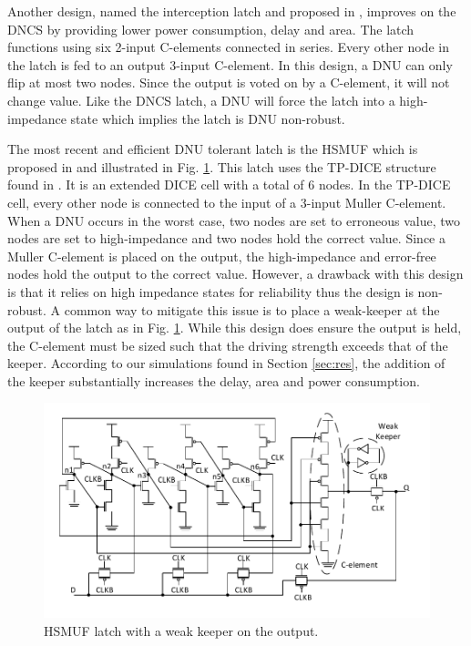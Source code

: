 Another design, named the interception latch and proposed in \cite{Inter}, improves on the DNCS by providing lower power consumption, delay and area. The latch functions using six 2-input C-elements connected in series. Every other node in the latch is fed to an output 3-input C-element. In this design, a DNU can only flip at most two nodes. Since the output is voted on by a C-element, it will not change value. Like the DNCS latch, a DNU will force the latch into a high-impedance state which implies the latch is DNU non-robust.

The most recent and efficient DNU tolerant latch is the HSMUF which is proposed in \cite{HSMUF} and illustrated in Fig. \ref{HSMUF_fig}. This latch uses the TP-DICE structure found in \cite{TPDICE}. It is an extended DICE cell with a total of 6 nodes. In the TP-DICE cell, every other node is connected to the input of a 3-input Muller C-element. When a DNU occurs in the worst case, two nodes are set to erroneous value, two nodes are set to high-impedance and two nodes hold the correct value. Since a Muller C-element is placed on the output, the high-impedance and error-free nodes hold the output to the correct value. However, a drawback with this design is that it relies on high impedance states for reliability thus the design is non-robust. A common way to mitigate this issue is to place a weak-keeper at the output of the latch as in Fig. \ref{HSMUF_fig}. While this design does ensure the output is held, the C-element must be sized such that the driving strength exceeds that of the keeper. According to our simulations found in Section \ref{sec:res}, the addition of the keeper substantially increases the delay, area and power consumption. 

\begin{figure}[!htbp]
\centering
\includegraphics[trim = 0mm 6mm 0mm 4mm, clip, width=\linewidth]{Figures/HSMUF}
\caption{HSMUF latch \cite{HSMUF} with a weak keeper on the output.}
\label{HSMUF_fig}
\end{figure}
 
